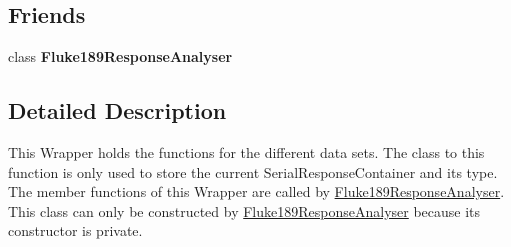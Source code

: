 \subsection*{Friends}
\begin{DoxyCompactItemize}
\item 
\hypertarget{classFluke_1_1Fluke189ResponseAnalyserWrapper_a3f3d92843e30fb798812558133ea4558}{
class {\bfseries Fluke189ResponseAnalyser}}
\label{classFluke_1_1Fluke189ResponseAnalyserWrapper_a3f3d92843e30fb798812558133ea4558}

\end{DoxyCompactItemize}


\subsection{Detailed Description}
This Wrapper holds the functions for the different data sets. The class to this function is only used to store the current SerialResponseContainer and its type. The member functions of this Wrapper are called by \hyperlink{classFluke_1_1Fluke189ResponseAnalyser}{Fluke189ResponseAnalyser}. This class can only be constructed by \hyperlink{classFluke_1_1Fluke189ResponseAnalyser}{Fluke189ResponseAnalyser} because its constructor is private. 

